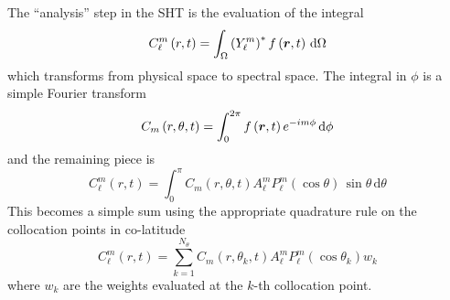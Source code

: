 \documentclass[10pt,letterpaper]{article}
\begin{document}
The ``analysis'' step in the SHT is the evaluation of the integral
\begin{equation}
  C_\ell^m\left(r,t\right) =
                  \int_\Omega \left(Y_\ell^m\right)^* f\left(\bm{r},t\right)
           \,\mathrm{d}\Omega
\end{equation}
which transforms from physical space to spectral space.
The integral in $\phi$ is a simple Fourier transform
\begin{equation}
  C_m\left(r,\theta,t\right) =
                  \int_0^{2\pi} f\left(\bm{r},t\right)e^{-i m \phi}
                  \,\mathrm{d}\phi
\end{equation}
and the remaining piece is
\begin{equation}
  C_\ell^m\left(r,t\right) =
                  \int_0^{\pi}
              C_m\left(r,\theta,t\right)A_\ell^mP_\ell^m\left(\cos\theta\right)
                  \,\sin\theta\,\mathrm{d}\theta
\end{equation}
This becomes a simple sum using the appropriate quadrature rule on the collocation points
in co-latitude
\begin{equation}
  C_\ell^m\left(r,t\right) =
           \sum\limits_{k=1}^{N_\theta}
              C_m\left(r,\theta_k,t\right)A_\ell^mP_\ell^m\left(\cos\theta_k\right)
              w_k
\end{equation}
where $w_k$ are the weights evaluated at the $k$-th collocation point.
\end{document}
